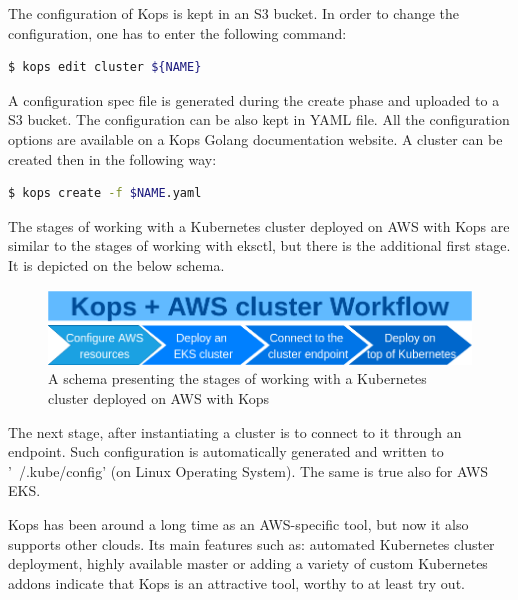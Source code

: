 The configuration of Kops is kept in an S3 bucket. In order to change the configuration, one has to enter the following command\cite{online-kops-aws}:
\begin{lstlisting}[basicstyle=\small,caption={A command of Kops CLI tool used to edit a Kubernetes cluster configuration},captionpos=b,language=Bash,xleftmargin=1cm]
$ kops edit cluster ${NAME}
\end{lstlisting}

A configuration spec file is generated during the create phase and uploaded to a S3 bucket. The configuration can be also kept in YAML file. All the configuration options are available on a Kops Golang documentation website\cite{online-kops-yaml-config-golang}. A cluster can be created then in the following way\cite{online-kops-yaml-config}:
\begin{lstlisting}[basicstyle=\small,caption={A command of Kops CLI tool used to create a Kubernetes cluster using a YAML configuration file},captionpos=b,language=Bash,xleftmargin=1cm]
$ kops create -f $NAME.yaml
\end{lstlisting}


The stages of working with a Kubernetes cluster deployed on AWS with Kops are similar to the stages of working with eksctl, but there is the additional first stage. It is depicted on the below schema.
\begin{figure}[H]
    \centering
    \includegraphics[width=12cm]{figures/kops-aws-workflow.png}
    \captionsetup{justification=centering,margin=2cm}
    \caption{A schema presenting the stages of working with a Kubernetes cluster deployed on AWS with Kops}
\end{figure}

The next stage, after instantiating a cluster is to connect to it through an endpoint. Such configuration is automatically generated and written to '~/.kube/config' (on Linux Operating System)\cite{online-kops-aws}. The same is true also for AWS EKS.

Kops has been around a long time as an AWS-specific tool, but now it also supports other clouds\cite{book-cndwk}\cite{online-kops-gh}. Its main features such as: automated Kubernetes cluster deployment, highly available master or adding a variety of custom Kubernetes addons\cite{kops-addons} indicate that Kops is an attractive tool, worthy to at least try out.

